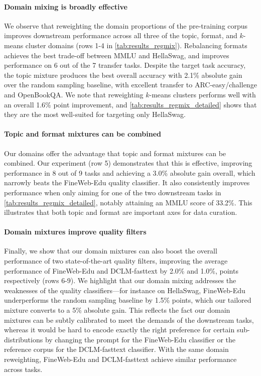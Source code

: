 \paragraph{Domain mixing is broadly effective}
We observe that reweighting the domain proportions of the pre-training corpus improves downstream performance across all three of the topic, format, and $k$-means cluster domains (rows 1-4 in \autoref{tab:results_regmix}).
Rebalancing formats achieves the best trade-off between MMLU and HellaSwag, and improves performance on 6 out of the 7 transfer tasks.
Despite the target task accuracy, the topic mixture produces the best overall accuracy with 2.1\% absolute gain over the random sampling baseline, with excellent transfer to ARC-easy/challenge and OpenBookQA. 
We note that reweighting $k$-means clusters performs well with an overall 1.6\% point improvement, and  
\autoref{tab:results_regmix_detailed} shows that they are the most well-suited for targeting only HellaSwag.

\paragraph{Topic and format mixtures can be combined}
Our domains offer the advantage that topic and format mixtures can be combined. Our experiment (row 5) demonstrates that this is effective, improving performance in 8 out of 9 tasks and achieving a 3.0\% absolute gain overall, which narrowly beats the FineWeb-Edu quality classifier.
It also consistently improves performance when only aiming for one of the two downstream tasks in \autoref{tab:results_regmix_detailed}, notably attaining an MMLU score of 33.2\%.
This illustrates that both topic and format are important axes for data curation.

\paragraph{Domain mixtures improve quality filters}
Finally, we show that our domain mixtures can also boost the overall performance of two state-of-the-art quality filters, improving the average performance of FineWeb-Edu and DCLM-fasttext by 2.0\% and 1.0\%, points respectively (rows 6-9).
We highlight that our domain mixing addresses the weaknesses of the quality classifiers---for instance on HellaSwag, FineWeb-Edu underperforms the random sampling baseline by 1.5\% points, which our tailored mixture converts to a 5\% absolute gain.
This reflects the fact our domain mixtures can be subtly calibrated to meet the demands of the downstream tasks, whereas it would be hard to encode exactly the right preference for certain sub-distributions by changing the prompt for the FineWeb-Edu classifier or the reference corpus for the DCLM-fasttext classifier.
With the same domain reweighting,
FineWeb-Edu and DCLM-fasttext achieve similar performance across tasks.
